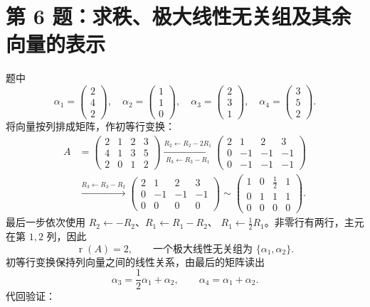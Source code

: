 \documentclass[11pt,a4paper,fontset=fandol]{ctexart}
\newcommand{\problem}[1]{\Needspace{6\baselineskip}\section*{#1}}
\newcommand{\ans}[1]{\boxed{#1}}
\newcommand{\rank}{\operatorname{r}}
\begin{document}
\newpage
\problem{第 6 题：求秩、极大线性无关组及其余向量的表示}
题中
\[
\alpha_1=\begin{pmatrix}2\\4\\2\end{pmatrix},\quad
\alpha_2=\begin{pmatrix}1\\1\\0\end{pmatrix},\quad
\alpha_3=\begin{pmatrix}2\\3\\1\end{pmatrix},\quad
\alpha_4=\begin{pmatrix}3\\5\\2\end{pmatrix}.
\]
将向量按列排成矩阵，作初等行变换：
\[
\begin{aligned}
A&=\begin{pmatrix}2&1&2&3\\4&1&3&5\\2&0&1&2\end{pmatrix}
\xrightarrow[\ R_3\leftarrow R_3-R_1\ ]{R_2\leftarrow R_2-2R_1}
\begin{pmatrix}2&1&2&3\\0&-1&-1&-1\\0&-1&-1&-1\end{pmatrix}\\[3pt]
&\xrightarrow{R_3\leftarrow R_3-R_2}
\begin{pmatrix}2&1&2&3\\0&-1&-1&-1\\0&0&0&0\end{pmatrix}
\sim
\begin{pmatrix}1&0&\frac12&1\\0&1&1&1\\0&0&0&0\end{pmatrix}.
\end{aligned}
\]
最后一步依次使用 $R_2\leftarrow-R_2$、$R_1\leftarrow R_1-R_2$、
$R_1\leftarrow\frac12R_1$。非零行有两行，主元在第 $1,2$ 列，因此
\[
\ans{\rank(A)=2,\qquad \text{一个极大线性无关组为 }\{\alpha_1,\alpha_2\}.}
\]
初等行变换保持列向量之间的线性关系，由最后的矩阵读出
\[
\ans{\alpha_3=\frac12\alpha_1+\alpha_2,\qquad
\alpha_4=\alpha_1+\alpha_2.}
\]
代回验证：
\end{document}
